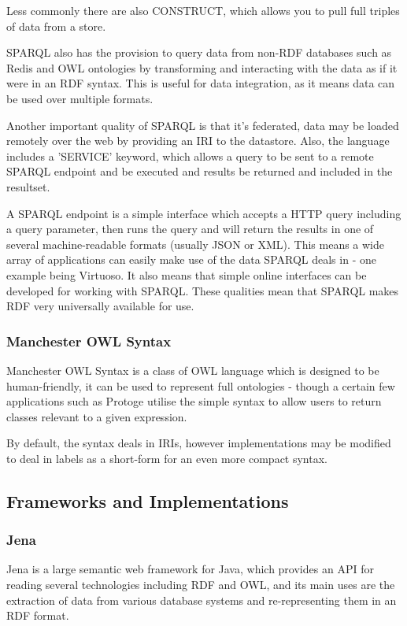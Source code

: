 \documentclass{article}
\begin{document}
Less commonly there are also CONSTRUCT, which allows you to pull full triples of
data from a store.

SPARQL also has the provision to query data from non-RDF databases such as Redis
and OWL ontologies by transforming and interacting with the data as if it were
in an RDF syntax. This is useful for data integration, as it means data can be
used over multiple formats. 

Another important quality of SPARQL is that it's federated, data may be loaded
remotely over the web by providing an IRI to the datastore. Also, the language
includes a 'SERVICE' keyword, which allows a query to be sent to a remote SPARQL
endpoint and be executed and results be returned and included in the resultset.

A SPARQL endpoint is a simple interface which accepts a HTTP query including a
query parameter, then runs the query and will return the results in one of 
several machine-readable formats (usually JSON or XML). This means a wide array
of applications can easily make use of the data SPARQL deals in - one example
being Virtuoso. It also means that simple online interfaces can be developed for 
working with SPARQL. These qualities mean that SPARQL makes RDF very universally
available for use.

\subsubsection{Manchester OWL Syntax}

Manchester OWL Syntax is a class of OWL language which is designed to be
human-friendly, it can be used to represent full ontologies - though a certain
few applications such as Protoge utilise the simple syntax to allow users to
return classes relevant to a given expression.

By default, the syntax deals in IRIs, however implementations may be modified to
deal in labels as a short-form for an even more compact syntax.

\subsection{Frameworks and Implementations} 

\subsubsection{Jena}

Jena is a large semantic web framework for Java, which provides an API for
reading several technologies including RDF and OWL, and its main uses are
the extraction of data from various database systems and re-representing them in
an RDF format. 
\end{document}
